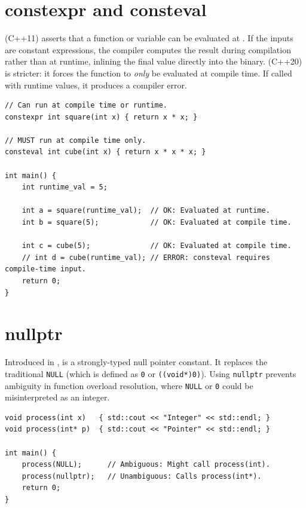 \section{constexpr and consteval}
 (C++11) asserts that a function or variable can be evaluated at . If the inputs are constant expressions, the compiler computes the result during compilation rather than at runtime, inlining the final value directly into the binary.
 (C++20) is stricter: it forces the function to \emph{only} be evaluated at compile time. If called with runtime values, it produces a compiler error.
\begin{lstlisting}
// Can run at compile time or runtime.
constexpr int square(int x) { return x * x; }

// MUST run at compile time only.
consteval int cube(int x) { return x * x * x; }

int main() {
    int runtime_val = 5;

    int a = square(runtime_val);  // OK: Evaluated at runtime.
    int b = square(5);            // OK: Evaluated at compile time.

    int c = cube(5);              // OK: Evaluated at compile time.
    // int d = cube(runtime_val); // ERROR: consteval requires compile-time input.
    return 0;
}
\end{lstlisting}

\section{nullptr}
Introduced in ,  is a strongly-typed null pointer constant. It replaces the traditional \texttt{NULL} (which is defined as \texttt{0} or \texttt{((void*)0)}). Using \texttt{nullptr} prevents ambiguity in function overload resolution, where \texttt{NULL} or \texttt{0} could be misinterpreted as an integer.
\begin{lstlisting}
void process(int x)   { std::cout << "Integer" << std::endl; }
void process(int* p)  { std::cout << "Pointer" << std::endl; }

int main() {
    process(NULL);      // Ambiguous: Might call process(int).
    process(nullptr);   // Unambiguous: Calls process(int*).
    return 0;
}
\end{lstlisting}


